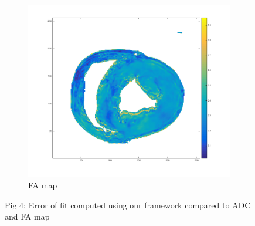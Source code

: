 \begin{figure}
    \begin{subfigure}{.31\textwidth}
        \includegraphics[width=\textwidth]{figures/pig4_fa_21}
        \caption{FA map}
        \label{fig:pig4_fa}
    \end{subfigure}
    \caption{Pig 4: Error of fit computed using our framework compared to ADC and FA map}
    \label{fig:pig4}
\end{figure}

